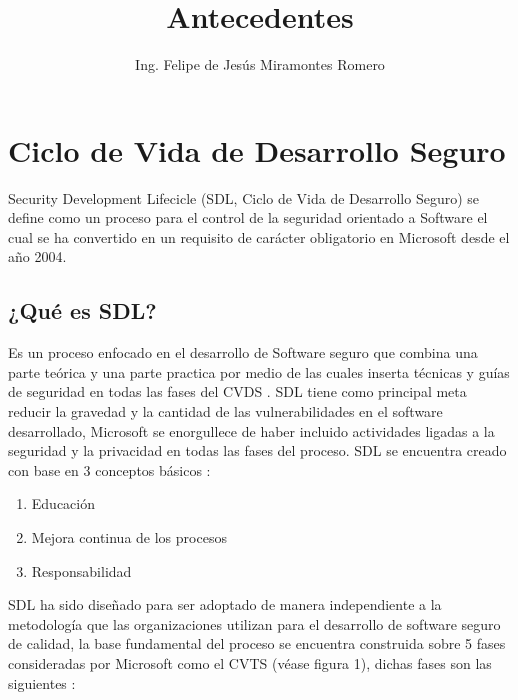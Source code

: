 \documentclass[runningheads,a4paper]{llncs}
\begin{document}
\mainmatter  
\title{Antecedentes}
\author{Ing. Felipe de Jesús Miramontes Romero}
\maketitle

\section{Ciclo de Vida de Desarrollo Seguro}
Security Development Lifecicle (SDL, Ciclo de Vida de Desarrollo Seguro) se define como un proceso para el control de la seguridad orientado a \gls{Software} el cual se ha convertido en un requisito de carácter obligatorio en Microsoft desde el año 2004. 

\subsection{¿Qué es \gls{SDL}?}
Es un proceso enfocado en el desarrollo de \gls{Software} seguro que combina una parte teórica y una parte practica por medio de las cuales inserta técnicas y guías de seguridad en todas las fases del \gls{CVDS} \cite{SDLWhitePaper}. \gls{SDL} tiene como principal meta reducir la gravedad y la cantidad de las vulnerabilidades en el software desarrollado, Microsoft se enorgullece de haber incluido actividades ligadas a la seguridad y la privacidad en todas las fases del proceso. \gls{SDL} se encuentra creado con base en 3 conceptos básicos \cite{SDLImplementacionSimplificada}: 

\begin{enumerate}
	\item Educación
	\item Mejora continua de los procesos 
	\item Responsabilidad
\end{enumerate}

\gls{SDL} ha sido diseñado para ser adoptado de manera independiente a la metodología que las organizaciones utilizan para el desarrollo de software seguro de calidad, la base fundamental del proceso se encuentra construida sobre 5 fases consideradas por Microsoft como el \gls{CVTS} (véase figura 1), dichas fases son las siguientes \cite{SDLWhitePaper}: 
\end{document}
